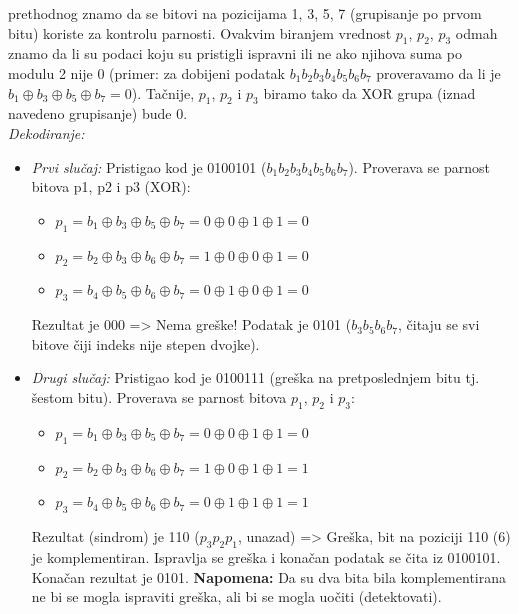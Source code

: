 \documentclass[a4paper]{article}
\begin{document}
        prethodnog znamo da se bitovi na pozicijama 1, 3, 5, 7 (grupisanje po prvom bitu) koriste za kontrolu parnosti.
        Ovakvim biranjem vrednost $p_1$, $p_2$, $p_3$ odmah znamo da li su podaci koju su pristigli ispravni 
        ili ne ako njihova suma po modulu 2 nije 0 (primer: za dobijeni podatak $b_1 b_2 b_3
        b_4 b_5 b_6 b_7$ proveravamo da li je $b_1 \oplus b_3 \oplus b_5 \oplus b_7 = 0$). Tačnije, 
        $p_1$, $p_2$ i $p_3$ biramo tako da XOR grupa (iznad navedeno grupisanje) bude 0.\\
        \textit{Dekodiranje:}
        \begin{itemize}
            \item \textit{Prvi slučaj:} Pristigao kod je 0100101 ($b_1 b_2 b_3 b_4 b_5 b_6 b_7$). 
                  Proverava se parnost bitova p1, p2 i p3 (XOR):
                  \begin{itemize}
                      \item $p_1 = b_1 \oplus b_3 \oplus b_5 \oplus b_7 = 0\oplus 0\oplus 1\oplus 1 = 0$
                      \item $p_2 = b_2 \oplus b_3 \oplus b_6 \oplus b_7 = 1\oplus 0\oplus 0\oplus 1 = 0$  
                      \item $p_3 = b_4 \oplus b_5 \oplus b_6 \oplus b_7 = 0\oplus 1\oplus 0\oplus 1 = 0$
                  \end{itemize}
                  Rezultat je 000 => Nema greške! Podatak je 0101 ($b_3 b_5 b_6 b_7$, čitaju se svi bitove
                  čiji indeks nije stepen dvojke).
            \item \textit{Drugi slučaj:} Pristigao kod je 0100111 (greška na pretposlednjem bitu tj. šestom bitu). 
                  Proverava se parnost bitova $p_1$, $p_2$ i $p_3$:
                  \begin{itemize}
                      \item $p_1 = b_1 \oplus b_3 \oplus b_5 \oplus b_7 = 0\oplus 0\oplus 1\oplus 1 = 0$
                      \item $p_2 = b_2 \oplus b_3 \oplus b_6 \oplus b_7 = 1\oplus 0\oplus 1\oplus 1 = 1$  
                      \item $p_3 = b_4 \oplus b_5 \oplus b_6 \oplus b_7 = 0\oplus 1\oplus 1\oplus 1 = 1$
                  \end{itemize}
                  Rezultat (sindrom) je 110 ($p_3 p_2 p_1$, unazad) => Greška, bit na poziciji 110 (6) je
                  komplementiran. Ispravlja se greška i konačan podatak se čita iz 0100101. Konačan
                  rezultat je 0101. \textbf{Napomena:} Da su dva bita bila komplementirana ne bi se mogla ispraviti
                  greška, ali bi se mogla uočiti (detektovati).
        \end{itemize}
    
\end{document}
